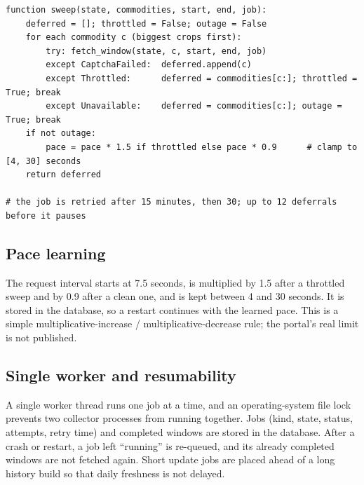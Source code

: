 \documentclass[12pt,a4paper,oneside]{report}
\numberwithin{equation}{chapter}
\numberwithin{figure}{chapter}
\numberwithin{table}{chapter}
\theoremstyle{definition}
\begin{document}
\begin{lstlisting}[caption={Sweep over commodities with deferral and pace adaptation}]
function sweep(state, commodities, start, end, job):
    deferred = []; throttled = False; outage = False
    for each commodity c (biggest crops first):
        try: fetch_window(state, c, start, end, job)
        except CaptchaFailed:  deferred.append(c)
        except Throttled:      deferred = commodities[c:]; throttled = True; break
        except Unavailable:    deferred = commodities[c:]; outage = True; break
    if not outage:
        pace = pace * 1.5 if throttled else pace * 0.9      # clamp to [4, 30] seconds
    return deferred

# the job is retried after 15 minutes, then 30; up to 12 deferrals before it pauses
\end{lstlisting}

\subsection{Pace learning}
The request interval starts at 7.5 seconds, is multiplied by 1.5 after a throttled sweep and by 0.9 after a clean one, and is kept between 4 and 30 seconds. It is stored in the database, so a restart continues with the learned pace. This is a simple multiplicative-increase / multiplicative-decrease rule; the portal's real limit is not published.

\subsection{Single worker and resumability}
A single worker thread runs one job at a time, and an operating-system file lock prevents two collector processes from running together. Jobs (kind, state, status, attempts, retry time) and completed windows are stored in the database. After a crash or restart, a job left ``running'' is re-queued, and its already completed windows are not fetched again. Short update jobs are placed ahead of a long history build so that daily freshness is not delayed.
\end{document}
